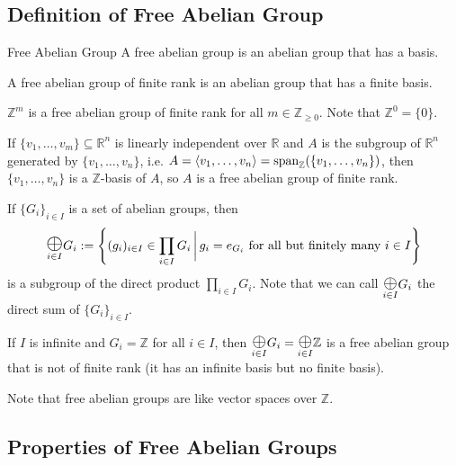 \documentclass{article}
\begin{document}
\subsection{Definition of Free Abelian Group}
\begin{definition}{Free Abelian Group}
    A free abelian group is an abelian group that has a basis.
    \vspace{2mm}

    A free abelian group of finite rank is an abelian group that has a finite basis.
\end{definition}
\begin{example}
    $\mathbb{Z}^m$ is a free abelian group of finite rank for all $m\in \mathbb{Z}_{\ge 0}$. Note that $\mathbb{Z}^0=\{0\}$.
\end{example}
\begin{example}
    If $\{v_1,\dots,v_m\} \subseteq \mathbb{R}^n$ is linearly independent over $\mathbb{R}$ and $A$ is the subgroup of $\mathbb{R}^n$ generated by $\{v_1,\dots,v_n\}$, i.e. $A=\langle v_1,\dots,v_n\rangle=\mathrm{span}_{\mathbb{Z}}(\{v_1,\dots,v_n\})$, then $\{v_1,\dots,v_n\}$ is a $\mathbb{Z}$-basis of $A$, so $A$ is a free abelian group of finite rank.
\end{example}
\begin{example}
    If $\{G_i\}_{i\in I}$ is a set of abelian groups, then
    $$\Oplus{i\in I} G_i := \left\{(g_i)_{i\in I} \in \prod_{i\in I}G_i\,\bigg\vert\,g_i = e_{G_i} \text{ for all but finitely many } i \in I\right\}$$
    is a subgroup of the direct product $\prod_{i\in I} G_i$. Note that we can call $\Oplus{i\in I} G_i$ the direct sum of $\{G_i\}_{i \in I}$.

    If $I$ is infinite and $G_i=\mathbb{Z}$ for all $i\in I$, then $\Oplus{i\in I}G_i = \Oplus{i\in I}\mathbb{Z}$ is a free abelian group that is not of finite rank (it has an infinite basis but no finite basis).
\end{example}
Note that free abelian groups are like vector spaces over $\mathbb{Z}$.
\subsection{Properties of Free Abelian Groups}
\end{document}
